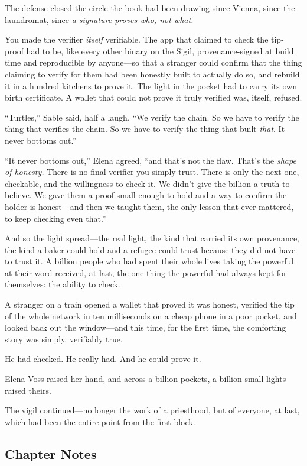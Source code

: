 \documentclass[12pt,letterpaper]{book}
\begin{document}
The defense closed the circle the book had been drawing since Vienna, since the
laundromat, since \emph{a signature proves who, not what.}

You made the verifier \emph{itself} verifiable. The app that claimed to check the
tip-proof had to be, like every other binary on the Sigil, provenance-signed at build
time and reproducible by anyone---so that a stranger could confirm that the thing
claiming to verify for them had been honestly built to actually do so, and rebuild it
in a hundred kitchens to prove it. The light in the pocket had to carry its own birth
certificate. A wallet that could not prove it truly verified was, itself, refused.

``Turtles,'' Sable said, half a laugh. ``We verify the chain. So we have to verify the
thing that verifies the chain. So we have to verify the thing that built \emph{that}.
It never bottoms out.''

``It never bottoms out,'' Elena agreed, ``and that's not the flaw. That's the
\emph{shape of honesty.} There is no final verifier you simply trust. There is only
the next one, checkable, and the willingness to check it. We didn't give the billion a
truth to believe. We gave them a proof small enough to hold and a way to confirm the
holder is honest---and then we taught them, the only lesson that ever mattered, to
keep checking even that.''

And so the light spread---the real light, the kind that carried its own provenance, the
kind a baker could hold and a refugee could trust because they did not have to trust
it. A billion people who had spent their whole lives taking the powerful at their word
received, at last, the one thing the powerful had always kept for themselves: the
ability to check.

A stranger on a train opened a wallet that proved it was honest, verified the tip of
the whole network in ten milliseconds on a cheap phone in a poor pocket, and looked
back out the window---and this time, for the first time, the comforting story was
simply, verifiably true.

He had checked. He really had. And he could prove it.

Elena Voss raised her hand, and across a billion pockets, a billion small lights
raised theirs.

The vigil continued---no longer the work of a priesthood, but of everyone, at last,
which had been the entire point from the first block.

\hypertarget{chapter-25-notes}{%
\subsection{Chapter Notes}\label{chapter-25-notes}}
\end{document}
